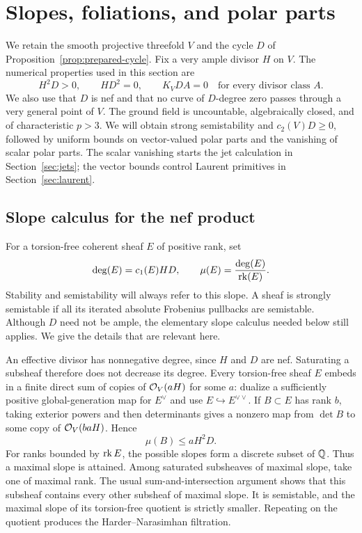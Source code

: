 \section{Slopes, foliations, and polar parts}
\label{sec:slopes}

We retain the smooth projective threefold $V$ and the cycle $D$ of
Proposition~\ref{prop:prepared-cycle}.  Fix a very ample divisor $H$ on $V$.
The numerical properties used in this section are
\begin{equation}
  H^2D>0,\qquad HD^2=0,\qquad K_VDA=0
  \quad\text{for every divisor class }A.
  \label{eq:slope-numerical-input}
\end{equation}
We also use that $D$ is nef and that no curve of $D$-degree zero passes
through a very general point of $V$.  The ground field is uncountable,
algebraically closed, and of characteristic $p>3$.
We will obtain strong semistability and $c_2(V)D\geq0$, followed by
uniform bounds on vector-valued polar parts and the vanishing of scalar
polar parts.  The scalar vanishing starts the jet calculation in
Section~\ref{sec:jets}; the vector bounds control Laurent primitives in
Section~\ref{sec:laurent}.

\subsection{Slope calculus for the nef product}

For a torsion-free coherent sheaf $E$ of positive rank, set
\[
  \deg(E)=c_1(E)HD,\qquad
  \mu(E)=\frac{\deg(E)}{\operatorname{rk}(E)}.
\]
Stability and semistability will always refer to this slope.  A sheaf is
strongly semistable if all its iterated absolute Frobenius pullbacks are
semistable.  Although $D$ need not be ample, the elementary slope calculus
needed below still applies.  We give the details that are relevant here.

An effective divisor has nonnegative degree, since $H$ and $D$ are nef.
Saturating a subsheaf therefore does not decrease its degree.  Every
torsion-free sheaf $E$ embeds in a finite direct sum of copies of
$\mathcal O_V(aH)$ for some $a$: dualize a sufficiently positive global-generation
map for $E^\vee$ and use $E\hookrightarrow E^{\vee\vee}$.  If $B\subset E$
has rank $b$, taking exterior powers and then determinants gives a nonzero
map from $\det B$ to some copy of $\mathcal O_V(baH)$.  Hence
\[
  \mu(B)\le aH^2D.
\]
For ranks bounded by $\operatorname{rk} E$, the possible slopes form a discrete subset of
$\mathbb Q$.  Thus a maximal slope is attained.  Among saturated subsheaves of
maximal slope, take one of maximal rank.  The usual sum-and-intersection
argument shows that this subsheaf contains every other subsheaf of maximal
slope.  It is semistable, and the maximal slope of its torsion-free quotient
is strictly smaller.  Repeating on the quotient produces the
Harder--Narasimhan filtration.

